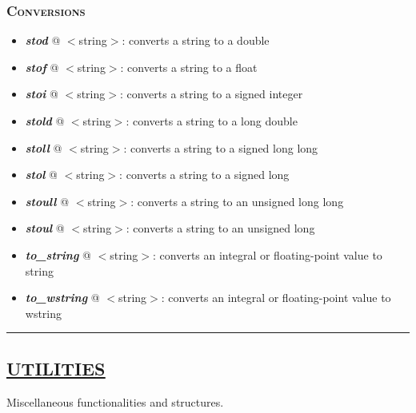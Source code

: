 \documentclass[10pt]{article}
\begin{document}
\begin{multicols*}{5}
{\subsubsection*{\textsc{Conversions}} 
\begin{itemize}[leftmargin=*,topsep=0.25pt]
  \setlength\itemsep{-1.8pt}
\item  \emph{\textbf{stod}} @ $<$string$>$: converts a string to a double
\item  \emph{\textbf{stof}} @ $<$string$>$: converts a string to a float
\item  \emph{\textbf{stoi}} @ $<$string$>$: converts a string to a signed integer
\item  \emph{\textbf{stold}} @ $<$string$>$: converts a string to a long double
\item  \emph{\textbf{stoll}} @ $<$string$>$: converts a string to a signed long long
\item  \emph{\textbf{stol}} @ $<$string$>$: converts a string to a signed long
\item  \emph{\textbf{stoull}} @ $<$string$>$: converts a string to an unsigned long long
\item  \emph{\textbf{stoul}} @ $<$string$>$: converts a string to an unsigned long
\item  \emph{\textbf{to\_string}} @ $<$string$>$: converts an integral or floating-point value to string
\item  \emph{\textbf{to\_wstring}} @ $<$string$>$: converts an integral or floating-point value to wstring
\end{itemize}

\par\noindent\rule{155pt}{0.4pt}

{\color{Blue}
\subsection*{\href{https://en.cppreference.com/w/cpp/utility}{\underline{UTILITIES}}}	
\noindent
Miscellaneous functionalities and structures.

}}
\end{multicols*}
\end{document}

